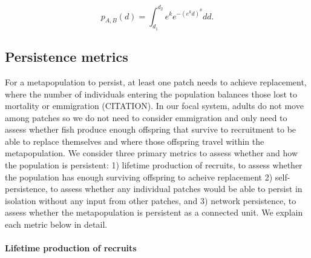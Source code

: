 \documentclass[12pt, oneside]{article}   	%
\begin{document}
\begin{equation} %
p_{A, B}(d) = \int_{d_1}^{d_2} e^k e^{-(e^k d)^\theta}  dd. \label{EQN_integratingDK}
\end{equation}

\subsection*{Persistence metrics}


For a metapopulation to persist, at least one patch needs to achieve replacement, where the number of individuals entering the population balances those lost to mortality or emmigration (CITATION). In our focal system, adults do not move among patches so we do not need to consider emmigration and only need to assess whether fish produce enough offspring that survive to recruitment to be able to replace themselves and where those offspring travel within the metapopulation. We consider three primary metrics to assess whether and how the population is persistent: 1) lifetime production of recruits, to assess whether the population has enough surviving offspring to acheive replacement 2) self-persistence, to assess whether any individual patches would be able to persist in isolation without any input from other patches, and 3) network persistence, to assess whether the metapopulation is persistent as a connected unit. We explain each metric below in detail. %


\paragraph*{Lifetime production of recruits}


\end{document}
